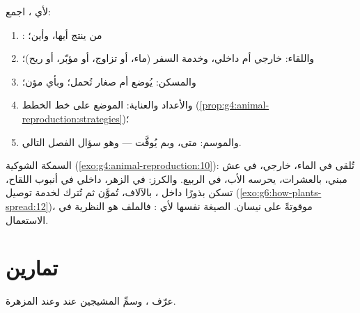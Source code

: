 \begin{method}\label{met:g8:sexual-reproduction:dossier}
لأي ، اجمع:
\begin{enumerate}
  \item {}: من ينتج أيها، وأين؛
  \item واللقاء:  خارجي أم داخلي، وخدمة السفر (ماء، أو
        تزاوج، أو مؤبّر، أو ريح)؛
  \item والمسكن:  يُوضع أم صغار تُحمل؛ وبأي مؤن؛
  \item والأعداد والعناية: الموضع على خط الخطط
        (\cref{prop:g4:animal-reproduction:strategies})؛
  \item والموسم: متى، وبم يُوقَّت --- وهو سؤال الفصل التالي.
\end{enumerate}
\end{method}

\begin{example}\label{ex:g8:sexual-reproduction:dossiers}
السمكة الشوكية (\cref{exo:g4:animal-reproduction:10}): 
تُلقى في الماء،  خارجي،  في عش مبني، بالعشرات، يحرسه
الأب، في الربيع. والكرز:  في الزهر،  داخلي في أنبوب
اللقاح،  تسكن بذورًا داخل ، بالآلاف، تُموَّن ثم تُترك
لخدمة توصيل 
(\cref{exo:g6:how-plants-spread:12})، موقوتةً على نيسان.
الصيغة نفسها لأي : فالملف هو النظرية في الاستعمال.
\end{example}

\section{تمارين}

\begin{exercise}[$\star$]\label{exo:g8:sexual-reproduction:1}
عرّف  ، وسمِّ المشيجين عند  وعند 
المزهرة.
\end{exercise}

